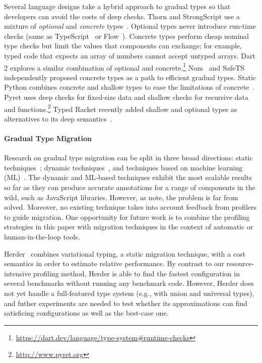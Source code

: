 Several language designs take a hybrid approach to gradual types
so that developers can avoid the costs of deep checks.
Thorn and StrongScript use a mixture of
\emph{optional} and \emph{concrete} types~\citep{wzlov-popl-2010,rzv-ecoop-2015}.
Optional types never introduce run-time checks (same as TypeScript~\cite{bat-ecoop-2014} or Flow~\cite{cvgrl-oopsla-2017}).
Concrete types perform cheap nominal type checks but limit the values that components
can exchange; for example, typed code that expects an array of numbers cannot accept
untyped arrays.
Dart 2 explores a similar combination of optional and
concrete.\footnote{\url{https://dart.dev/language/type-system\#runtime-checks}}
Nom~\cite{mt-oopsla-2017,mt-oopsla-2021} and SafeTS~\cite{rsfbv-popl-2015} independently
proposed concrete types as a path to efficient gradual types.
Static Python combines concrete and shallow types to ease the limitations
of concrete~\citep{lgmvpk-pj-2023}.
Pyret uses deep checks for fixed-size data and shallow checks for recursive
data and functions.\footnote{\url{http://www.pyret.org}}
Typed Racket recently added shallow and optional types as alternatives to its deep
semantics~\cite{g-deep-shallow}.

\paragraph{Gradual Type Migration}
Research on gradual type migration can be split in three broad directions:
static techniques~\cite{rch:in-out-infer-gt, km:ts-type-evo,
mp:gt-decidable, ccew:gt-migrate, gc:gt-infer,
cagg-solver-based-migration,clps-popl-2020,js-infer,ruby-static-infer,unif-infer};
dynamic
techniques~\cite{msi:gt-infer-hm, dyn-infer-ruby, profile-guided-typing, gen-ts-decl, jstrace},
and techniques based on machine learning
(ML)~\cite{lambdanet,nl2ptype,learn-types-big-data,ml-ts}. The dynamic
and ML-based techniques exhibit the most scalable results so far as they
can produce accurate annotations for a range of components in the wild,
such as JavaScript libraries.
However, as \citet{ml-ts} note, the problem is far from solved.
Moreover, no existing technique takes into account feedback from profilers to
guide migration.
One opportunity for future work is to combine the profiling strategies in this
paper with migration techniques in the context of automatic or
human-in-the-loop tools.

Herder~\cite{ccw-icfp-2018} combines variational typing, a static migration
technique, with a cost semantics in order to estimate relative performance.
By contrast to our resource-intensive profiling method, Herder is able to find
the fastest configuration in several benchmarks without running any benchmark
code.
However, Herder does not yet handle a full-featured type system (e.g., with union
and universal types), and futher experiments are needed to test whether its
approximations can find satisficing configurations as well as the best-case one.



